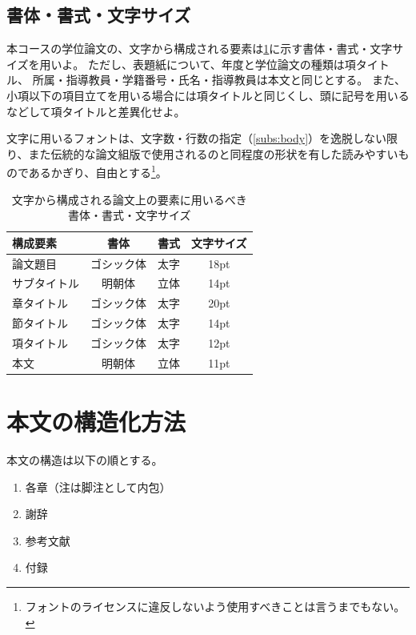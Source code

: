 		\subsection{書体・書式・文字サイズ}
			\label{sub:font}

			本コースの学位論文の、文字から構成される要素は\cref{tab:font}に示す書体・書式・文字サイズを用いよ。
			ただし、表題紙について、年度と学位論文の種類は項タイトル、
			所属・指導教員・学籍番号・氏名・指導教員は本文と同じとする。
			また、小項以下の項目立てを用いる場合には項タイトルと同じくし、頭に記号を用いるなどして項タイトルと差異化せよ。

			文字に用いるフォントは、文字数・行数の指定（\cref{subs:body}）を逸脱しない限り、また伝統的な論文組版で使用されるのと同程度の形状を有した読みやすいものであるかぎり、自由とする\footnote{フォントのライセンスに違反しないよう使用すべきことは言うまでもない。}。

			\begin{table}[tb]
				\caption{文字から構成される論文上の要素に用いるべき書体・書式・文字サイズ}
				\label{tab:font}
				\centering

				\begin{tabular}{lccc}
				\toprule
				\textbf{構成要素} & \textbf{書体} & \textbf{書式} & \textbf{文字サイズ}\\
				\midrule
					論文題目 & ゴシック体 & 太字 & 18pt \\
					サブタイトル & 明朝体 & 立体 & 14pt \\
					章タイトル & ゴシック体 & 太字 & 20pt \\
					節タイトル & ゴシック体 & 太字 & 14pt \\
					項タイトル & ゴシック体 & 太字 & 12pt \\
					本文 & 明朝体 & 立体 & 11pt \\
				\bottomrule
				\end{tabular}
			\end{table}

	\section{本文の構造化方法}
		\label{sec:structure}

		本文の構造は以下の順とする。

		\begin{enumerate}
			\item 各章（注は脚注として内包）
			\item 謝辞
			\item 参考文献
			\item 付録
		\end{enumerate}

